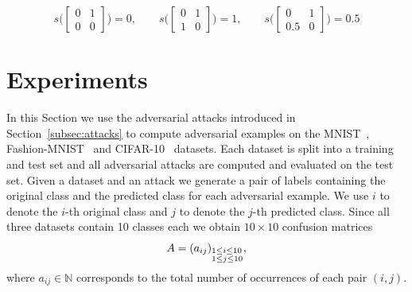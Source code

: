 \documentclass{article}
\begin{document}
\begin{equation*}
	s\bigg(\begin{bmatrix}
		0 & 1 \\
		0 & 0
	\end{bmatrix}\bigg) = 0, \qquad
%
	s\bigg(\begin{bmatrix}
		0 & 1 \\
		1 & 0
	\end{bmatrix}\bigg) = 1, \qquad
%
	s\bigg( \begin{bmatrix}
		0 & 1 \\
		0.5 & 0
	\end{bmatrix}\bigg) = 0.5
\end{equation*}
%
%



\section{Experiments}
\label{sec:experiments}

In this Section we use the adversarial attacks introduced in Section~\ref{subsec:attacks} to compute adversarial examples on the MNIST~\cite{deng2012mnist}, Fashion-MNIST~\cite{xiao2017fashion} and CIFAR-10~\cite{krizhevsky2009learning} datasets. Each dataset is split into a training and test set and all adversarial attacks are computed and evaluated on the test set. Given a dataset and an attack we generate a pair of labels containing the original class and the predicted class for each adversarial example. We use $i$ to denote the $i$-th original class and $j$ to denote the $j$-th predicted class. Since all three datasets contain 10 classes each we obtain $10\times10$ confusion matrices
\[A=(a_{ij})_{\begin{subarray}{l} 1\le i\le 10 \\ 1\le j\le 10\end{subarray}},\]
where $a_{ij}\in\mathbb{N}$ corresponds to the total number of occurrences of each pair $(i,j)$.
\end{document}
